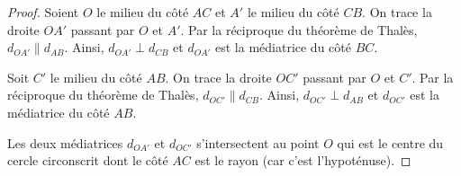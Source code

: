 \documentclass[a4paper,12pt]{report}
\begin{document}
\begin{proof}
\begin{minipage}[t]{0.5\textwidth}{
\vspace{0pt}
Soient $O$ le milieu du côté $AC$ et $A'$ le milieu du côté $CB$. On trace la droite $OA'$ passant par $O$ et $A'$. Par la réciproque du théorème de Thalès, $d_{OA'}\| d_{AB}$. Ainsi, $d_{OA'}\perp d_{CB}$ et $d_{OA'}$ est la médiatrice du côté $BC$.
\medskip

Soit $C'$ le milieu du côté $AB$. On trace la droite $OC'$ passant par $O$ et $C'$. Par la réciproque du théorème de Thalès, $d_{OC'}\| d_{CB}$. Ainsi, $d_{OC'}\perp d_{AB}$ et $d_{OC'}$ est la médiatrice du côté $AB$.
\medskip

Les deux médiatrices $d_{OA'}$ et $d_{OC'}$ s'intersectent au point $O$ qui est le centre du cercle circonscrit dont le côté $AC$ est le rayon (car c'est l'hypoténuse). 
}
\end{minipage}
\hfill
\begin{minipage}[t]{0.4\textwidth}{
\vspace{0pt}

}
\end{minipage}

\end{proof}
\end{document}

